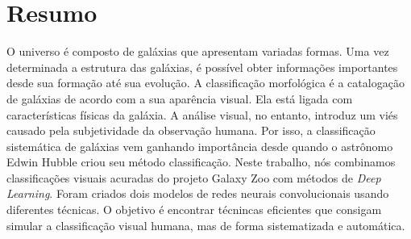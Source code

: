 \section*{Resumo}
 
O universo é composto de galáxias que apresentam variadas formas. Uma vez determinada a estrutura das galáxias, é possível obter informações importantes desde sua formação até sua evolução. A classificação morfológica é a catalogação de galáxias de acordo com a sua aparência visual. Ela está ligada com características físicas da galáxia. A análise visual, no entanto, introduz um viés causado pela subjetividade da observação humana. Por isso, a classificação sistemática de galáxias vem ganhando importância desde quando o astrônomo Edwin Hubble criou seu método classificação. Neste trabalho, nós combinamos classificações visuais acuradas do projeto Galaxy Zoo com métodos de \emph{Deep Learning}. Foram criados dois modelos de redes neurais convolucionais usando diferentes técnicas. O objetivo é encontrar técnincas eficientes que consigam simular a classificação visual humana, mas de forma sistematizada e automática.